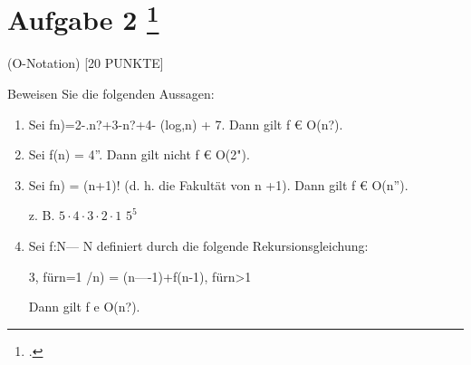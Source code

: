 \documentclass{lehramt-informatik-aufgabe}
\begin{document}
\liAufgabenTitel{}
\section{Aufgabe 2
\footcite{examen:66115:2020:09}}

 (O-Notation) [20 PUNKTE]

Beweisen Sie die folgenden Aussagen:

\begin{enumerate}


\item Sei fn)=2-.n?+3-n?+4- (log,n) + 7. Dann gilt f € O(n?).

\item Sei f(n) = 4”. Dann gilt nicht f € O(2").

\begin{liAntwort}

\end{liAntwort}


\item Sei fn) = (n+1)! (d. h. die Fakultät von n +1). Dann gilt f € O(n”).

\begin{liAntwort}
z. B. $5 \cdot 4 \cdot 3 \cdot  2 \cdot  1$ $5^5$
\end{liAntwort}

\item Sei f:N— N definiert durch die folgende Rekursionsgleichung:
\liMasterExkurs

3, fürn=1
/n) =
(n—-1)+f(n-1), fürn>1

Dann gilt f e O(n?).

\end{enumerate}
\end{document}
